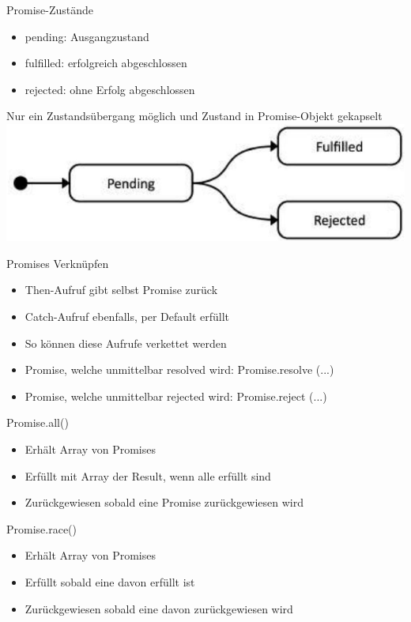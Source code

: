 \begin{definition}{Promise-Zustände}
\begin{itemize}
  \item pending: Ausgangzustand
  \item fulfilled: erfolgreich abgeschlossen
  \item rejected: ohne Erfolg abgeschlossen
  \end{itemize}
  Nur ein Zustandsübergang möglich und Zustand in Promise-Objekt gekapselt\\
\includegraphics[width=0.6\linewidth]{images/2024_12_29_858f09cde51177c71657g-14}
\end{definition}

\begin{definition}{Promises Verknüpfen}
\begin{itemize}
  \item Then-Aufruf gibt selbst Promise zurück
  \item Catch-Aufruf ebenfalls, per Default erfüllt
  \item So können diese Aufrufe verkettet werden
  \item Promise, welche unmittelbar resolved wird: Promise.resolve (...)
  \item Promise, welche unmittelbar rejected wird: Promise.reject (...)
\end{itemize}
\end{definition}

\begin{definition}{Promise.all()}
\begin{itemize}
  \item Erhält Array von Promises
  \item Erfüllt mit Array der Result, wenn alle erfüllt sind
  \item Zurückgewiesen sobald eine Promise zurückgewiesen wird
\end{itemize}
\end{definition}

\begin{definition}{Promise.race()}
\begin{itemize}
  \item Erhält Array von Promises
  \item Erfüllt sobald eine davon erfüllt ist
  \item Zurückgewiesen sobald eine davon zurückgewiesen wird
\end{itemize}
\end{definition}

